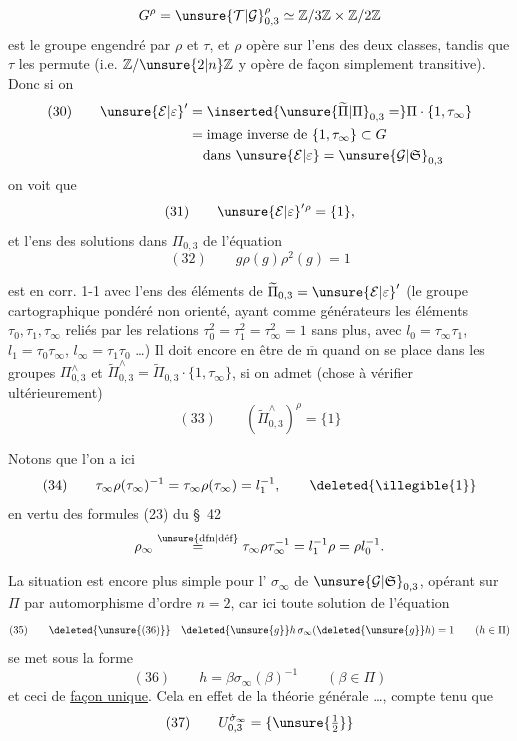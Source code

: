 \[
G^\rho=\unsure{\mathcal T|\mathcal G}_{0,3}^{\rho}
\simeq\mathbb Z/3\mathbb Z\times\mathbb Z/2\mathbb Z
\]
est le groupe engendré par $\rho$ et $\tau$, et $\rho$ opère  sur l'ens des deux classes, tandis que $\tau$ les permute (i.e. $\mathbb Z/\unsure{2|n}\mathbb Z$  y opère de façon simplement transitive).
Donc si on 
\[
\begin{aligned}
(30)\qquad\unsure{\mathcal E|\varepsilon}'
&=\inserted{\unsure{\widetilde\Pi|\Pi}_{0,3}=}\Pi\cdot\{1,\tau_\infty\}\\
&=\text{image inverse de }\{1,\tau_\infty\}\subset G\\
&\phantom{={}}\text{dans }\unsure{\mathcal E|\varepsilon}=\unsure{\mathcal G|\mathfrak S}_{0,3}
\end{aligned}
\]
on voit que
\[
(31)\qquad\unsure{\mathcal E|\varepsilon}'{}^\rho=\{1\},
\]
et l'ens des solutions dans \uline{$\Pi_{0,3}$} de l'équation
\[
(32)\qquad g\rho(g)\rho^2(g)=1
\]


est en corr. 1-1 avec l'ens des éléments de $\widetilde\Pi_{0,3}=\unsure{\mathcal E|\varepsilon}'$ (le groupe cartographique  pondéré non orienté, ayant comme générateurs les éléments $\tau_0,\tau_1,\tau_\infty$ reliés par les relations $\tau_0^2=\tau_1^2=\tau_\infty^2=1$ sans plus, avec $l_0=\tau_\infty\tau_1$, $l_1=\tau_0\tau_\infty$, $l_\infty=\tau_1\tau_0$ \dots)
Il doit encore en être de $\overline{\mathrm m}$ quand on se place dans les groupes $\Pi_{0,3}^{\wedge}$ et $\widetilde\Pi_{0,3}^{\wedge}=\widetilde\Pi_{0,3}\cdot\{1,\tau_\infty\}$, si on admet (chose à vérifier ultérieurement)
\[
(33)\qquad(\widetilde\Pi_{0,3}^{\wedge})^\rho=\{1\}
\]

Notons que l'on a ici
\[
(34)\qquad\tau_\infty\rho(\tau_\infty)^{-1}
=\tau_\infty\rho(\tau_\infty)=l_1^{-1},
\qquad\deleted{\illegible{1}}
\]
en vertu des formules (23) du \S\ 42
\[
\rho_\infty\overset{\unsure{\mathrm{dfn}|\text{déf}}}{=}
\tau_\infty\rho\tau_\infty^{-1}
=l_1^{-1}\rho=\rho l_0^{-1}.
\]

La situation est encore plus simple pour l' $\sigma_\infty$ de $\unsure{\mathcal G|\mathfrak S}_{0,3}$, opérant sur $\Pi$ par automorphisme d'ordre $n=2$, car ici toute solution de l'équation 
\[
(35)\qquad\deleted{\unsure{(36)}}\quad
\deleted{\unsure{g}}h\,\sigma_\infty(\deleted{\unsure{g}}h)=1
\qquad(h\in\Pi)
\]
se met sous la forme 
\[
(36)\qquad h=\beta\sigma_\infty(\beta)^{-1}
\qquad(\beta\in\Pi)
\]
et ceci de \uline{façon unique}. Cela  en effet de la théorie générale \dots, compte tenu que
\[
(37)\qquad U_{0,3}^{\dot\sigma_\infty}=\{\unsure{\tfrac12}\}
\]
